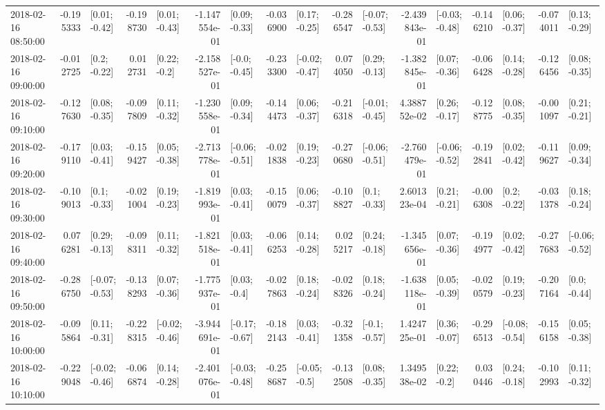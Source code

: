\begin{tabular}{lrlrlrlrlrlrlrlrl}
2018-02-16 08:50:00 & -0.195333 &   [0.01; -0.42] & -0.198730 &   [0.01; -0.43] & -1.147554e-01 &   [0.09; -0.33] & -0.036900 &   [0.17; -0.25] & -0.286547 &  [-0.07; -0.53] & -2.439843e-01 &  [-0.03; -0.48] & -0.146210 &   [0.06; -0.37] & -0.074011 &   [0.13; -0.29] \\
2018-02-16 09:00:00 & -0.012725 &    [0.2; -0.22] &  0.012731 &    [0.22; -0.2] & -2.158527e-01 &   [-0.0; -0.45] & -0.233300 &  [-0.02; -0.47] &  0.074050 &   [0.29; -0.13] & -1.382845e-01 &   [0.07; -0.36] & -0.066428 &   [0.14; -0.28] & -0.126456 &   [0.08; -0.35] \\
2018-02-16 09:10:00 & -0.127630 &   [0.08; -0.35] & -0.097809 &   [0.11; -0.32] & -1.230558e-01 &   [0.09; -0.34] & -0.144473 &   [0.06; -0.37] & -0.216318 &  [-0.01; -0.45] &  4.388752e-02 &   [0.26; -0.17] & -0.128775 &   [0.08; -0.35] & -0.001097 &   [0.21; -0.21] \\
2018-02-16 09:20:00 & -0.179110 &   [0.03; -0.41] & -0.159427 &   [0.05; -0.38] & -2.713778e-01 &  [-0.06; -0.51] & -0.021838 &   [0.19; -0.23] & -0.270680 &  [-0.06; -0.51] & -2.760479e-01 &  [-0.06; -0.52] & -0.192841 &   [0.02; -0.42] & -0.119627 &   [0.09; -0.34] \\
2018-02-16 09:30:00 & -0.109013 &    [0.1; -0.33] & -0.021004 &   [0.19; -0.23] & -1.819993e-01 &   [0.03; -0.41] & -0.150079 &   [0.06; -0.37] & -0.108827 &    [0.1; -0.33] &  2.601323e-04 &   [0.21; -0.21] & -0.006308 &    [0.2; -0.22] & -0.031378 &   [0.18; -0.24] \\
2018-02-16 09:40:00 &  0.076281 &   [0.29; -0.13] & -0.098311 &   [0.11; -0.32] & -1.821518e-01 &   [0.03; -0.41] & -0.066253 &   [0.14; -0.28] &  0.025217 &   [0.24; -0.18] & -1.345656e-01 &   [0.07; -0.36] & -0.194977 &   [0.02; -0.42] & -0.277683 &  [-0.06; -0.52] \\
2018-02-16 09:50:00 & -0.286750 &  [-0.07; -0.53] & -0.138293 &   [0.07; -0.36] & -1.775937e-01 &    [0.03; -0.4] & -0.027863 &   [0.18; -0.24] & -0.028326 &   [0.18; -0.24] & -1.638118e-01 &   [0.05; -0.39] & -0.020579 &   [0.19; -0.23] & -0.207164 &    [0.0; -0.44] \\
2018-02-16 10:00:00 & -0.095864 &   [0.11; -0.31] & -0.228315 &  [-0.02; -0.46] & -3.944691e-01 &  [-0.17; -0.67] & -0.182143 &   [0.03; -0.41] & -0.321358 &   [-0.1; -0.57] &  1.424725e-01 &   [0.36; -0.07] & -0.296513 &  [-0.08; -0.54] & -0.156158 &   [0.05; -0.38] \\
2018-02-16 10:10:00 & -0.229048 &  [-0.02; -0.46] & -0.066874 &   [0.14; -0.28] & -2.401076e-01 &  [-0.03; -0.48] & -0.258687 &   [-0.05; -0.5] & -0.132508 &   [0.08; -0.35] &  1.349538e-02 &    [0.22; -0.2] &  0.030446 &   [0.24; -0.18] & -0.102993 &   [0.11; -0.32] \\

\end{tabular}
